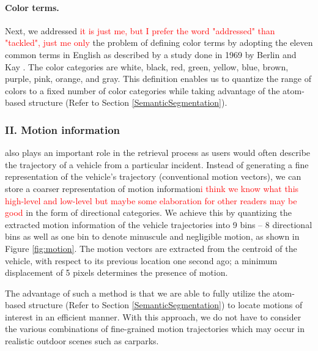 \documentclass[runningheads]{llncs}
\newcommand{\ian}[1]{\textcolor{red}{#1}}
\newcommand{\js}[1]{\textcolor{magenta}{#1}}
\newcommand{\ian}[1]{}   %
\newcommand{\js}[1]{}   %
\begin{document}
\paragraph{Color terms.} Next, we addressed \ian{it is just me, but I prefer the word "addressed" than "tackled", just me only} the problem of defining color terms by adopting the eleven common terms in English as described by a study done in 1969 by Berlin and Kay \cite{berlinandkay}. The color categories are white, black, red, green, yellow, blue, brown, purple, pink, orange, and gray. This definition enables us to quantize the range of colors to a fixed number of color categories while taking advantage of the atom-based structure (Refer to Section \ref{SemanticSegmentation}).

\subsubsection{II. Motion information} also plays an important role in the retrieval process as users would often describe the trajectory of a vehicle from a particular incident. 
Instead of generating a 
fine representation of the vehicle's trajectory (conventional motion vectors), 
we %
can store a coarser representation of motion information\ian{i think we know what this high-level and low-level but maybe some elaboration for other readers may be good}
in the form of directional categories.
We achieve this by quantizing the extracted motion information of the vehicle trajectories into 9 bins -- 8 directional bins as well as one bin to denote minuscule and negligible motion, as shown in Figure \ref{fig:motion}. The motion vectors are extracted from the centroid of the vehicle, 
with respect to its previous location one second ago; a minimum displacement of 5 pixels determines the presence of motion.
 
The advantage of such a method is that we are able to fully utilize the atom-based structure (Refer to Section \ref{SemanticSegmentation}) to locate motions of interest in an efficient manner. With this approach, we do not have to consider the various combinations of fine-grained motion trajectories which may occur in realistic outdoor scenes such as carparks. 
\end{document}
